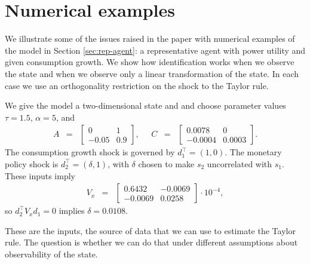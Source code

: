 \documentclass[11pt]{article}
\begin{document}
{\section{Numerical examples}
\label{app:examples}

We illustrate some of the issues raised in the paper with numerical examples
of the model in Section \ref{sec:rep-agent}:
a representative agent with power utility and given consumption growth.
We show how identification works when
we observe the state
and when we observe only a linear transformation of the state.
In each case we use an orthogonality restriction
on the shock to the Taylor rule.

We give the model a two-dimensional state and
and choose parameter values
$\tau=1.5$, $\alpha=5$, and
\begin{eqnarray*}
    A &=&
        \left[
        \begin{array}{rr}
        0 & 1 \\ -0.05 & 0.9
        \end{array}
        \right],
        \;\;\;\;\;
    C \;\;=\;\;
        \left[
        \begin{array}{rr}
        0.0078 & 0 \\ -0.0004 & 0.0003
        \end{array}
        \right] .
\end{eqnarray*}
The consumption growth shock is governed by $ d_1^\top = (1, 0)$.
The monetary policy shock is $ d_2^\top = (\delta, 1)$,
with $\delta$ chosen to make $s_2$ uncorrelated with $s_1$.
These inputs imply
\begin{eqnarray*}
    V_x &=&
       \left[
        \begin{array}{rr}
        0.6432 & -0.0069 \\ -0.0069 & 0.0258
        \end{array}
        \right] \cdot 10^{-4} ,
\end{eqnarray*}
so $ d_2^\top V_x d_1 = 0 $ implies $\delta = 0.0108$.

These are the inputs, the source of data that we can use
to estimate the Taylor rule.
The question is whether we can do that under different
assumptions about observability of the state.

}
\end{document}
